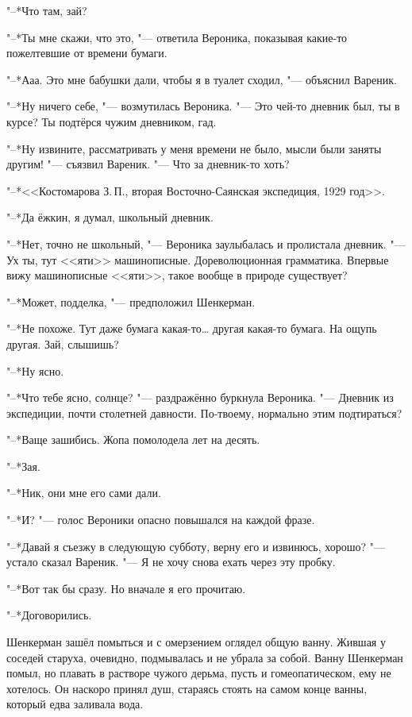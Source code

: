 "--*Что там, зай?

"--*Ты мне скажи, что это, "--- ответила Вероника, показывая какие-то пожелтевшие от времени бумаги.

"--*Ааа.
Это мне бабушки дали, чтобы я в туалет сходил, "--- объяснил Вареник.

"--*Ну ничего себе, "--- возмутилась Вероника.
"--- Это чей-то дневник был, ты в курсе?
Ты подтёрся чужим дневником, гад.

"--*Ну извините, рассматривать у меня времени не было, мысли были заняты другим! "--- съязвил Вареник.
"--- Что за дневник-то хоть?

"--*<<Костомарова З.\,П., вторая Восточно-Саянская экспедиция, 1929 год>>.

"--*Да ёжкин, я думал, школьный дневник.

"--*Нет, точно не школьный, "--- Вероника заулыбалась и пролистала дневник.
"--- Ух ты, тут <<яти>> машинописные.
Дореволюционная грамматика.
Впервые вижу машинописные <<яти>>, такое вообще в природе существует?

"--*Может, подделка, "--- предположил Шенкерман.

"--*Не похоже.
Тут даже бумага какая-то\ldots{} другая какая-то бумага.
На ощупь другая.
Зай, слышишь?

"--*Ну ясно.

"--*Что тебе ясно, солнце? "--- раздражённо буркнула Вероника.
"--- Дневник из экспедиции, почти столетней давности.
По-твоему, нормально этим подтираться?

"--*Ваще зашибись.
Жопа помолодела лет на десять.

"--*Зая.

"--*Ник, они мне его сами дали.

"--*И? "--- голос Вероники опасно повышался на каждой фразе.

"--*Давай я съезжу в следующую субботу, верну его и извинюсь, хорошо? "--- устало сказал Вареник.
"--- Я не хочу снова ехать через эту пробку.

"--*Вот так бы сразу.
Но вначале я его прочитаю.

"--*Договорились.

\asterism

\textspace

Шенкерман зашёл помыться и с омерзением оглядел общую ванну.
Жившая у соседей старуха, очевидно, подмывалась и не убрала за собой.
Ванну Шенкерман помыл, но плавать в растворе чужого дерьма, пусть и гомеопатическом, ему не хотелось.
Он наскоро принял душ, стараясь стоять на самом конце ванны, который едва заливала вода.

